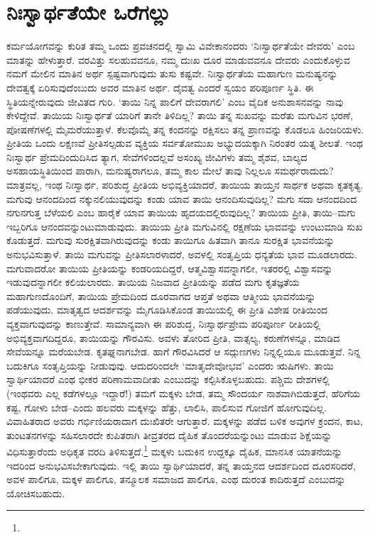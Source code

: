 \section*{ನಿಃಸ್ವಾರ್ಥತೆಯೇ ಒರೆಗಲ್ಲು}


ಕರ್ಮಯೋಗವನ್ನು ಕುರಿತ ತಮ್ಮ ಒಂದು ಪ್ರವಚನದಲ್ಲಿ ಸ್ವಾಮಿ ವಿವೇಕಾನಂದರು ‘ನಿಃಸ್ವಾರ್ಥ\-ತೆಯೇ ದೇವರು’ ಎಂಬ ಮಾತನ್ನು ಹೇಳುತ್ತಾರೆ. ವರವಿತ್ತು ಸಲಹುವವನೂ, ನಮ್ಮ ದುಃಖ ದೂರ ಮಾಡುವವನೂ ದೇವರು ಎಂದುಕೊಳ್ಳುವ ನಮಗೆ ಮೇಲಿನ ಮಾತಿನ ಅರ್ಥ ಸ್ಪಷ್ಟವಾಗುವುದು ತುಸು ಕಷ್ಟವೇ. ನಿಃಸ್ವಾರ್ಥತೆಯ ಮಹಾಗುಣ ಮನುಷ್ಯನನ್ನು ದೇವತ್ವಕ್ಕೆ ಏರಿಸುವುದೆಂಬುದು ಅವರ ಮಾತಿನ ಅರ್ಥ. ದೈವತ್ವ ಎಂದರೆ ಸ್ವಯಂ ಪರಿಪೂರ್ಣ ಸ್ಥಿತಿ. ಈ ಸ್ಥಿತಿಯನ್ನೇರುವುದು ಜೀವಿತದ ಗುರಿ. ‘ತಾಯಿ ನಿನ್ನ ಪಾಲಿಗೆ ದೇವರಾಗಲಿ’ ಎಂಬ ವೈದಿಕ ಅನುಶಾಸನವನ್ನು ನಾವು ಕೇಳಿದ್ದೇವೆ. ತಾಯಿಯ ನಿಃಸ್ವಾರ್ಥತೆ ಯಾರಿಗೆ ತಾನೇ ತಿಳಿದಿಲ್ಲ? ತಾಯಿ ತನ್ನ ಸುಖವನ್ನು ಮರೆತು ಮಗುವಿನ ಭರಣೆ, ಪೋಷಣೆಗಳಲ್ಲಿ ಮೈಮರೆಯುತ್ತಾಳೆ. ಕೆಲವೊಮ್ಮೆ ತನ್ನ ಕಂದನನ್ನು ರಕ್ಷಿಸಲು ತನ್ನ ಪ್ರಾಣವನ್ನು ಕೊಡಲೂ ಹಿಂಜರಿಯಳು. ಪ್ರೀತಿಯ ಒಂದು ಲಕ್ಷಣವೆ ಪ್ರೀತಿಸಲ್ಪಡುವ ವ್ಯಕ್ತಿಯ ಸರ್ವತೋಮುಖ ಅಭ್ಯುದಯಕ್ಕಾಗಿ ನಿರಂತರ ಯತ್ನ ಶೀಲತೆ. ಇಂಥ ನಿಃಸ್ವಾರ್ಥ ಪ್ರೇಮದಿಂದುದಿಸಿದ ತ್ಯಾಗ, ಸೇವೆಗಳಿಂದಲ್ಲವೆ ಅಸಂಖ್ಯ ಜೀವಿಗಳು ತಮ್ಮ ಶೈಶವ, ಬಾಲ್ಯದ ಅಸಹಾಯಸ್ಥಿತಿಯಿಂದ ಪಾರಾಗಿ, ಮನುಷ್ಯರಾಗಲೂ, ತಮ್ಮ ಕಾಲ ಮೇಲೆ ತಾವು ನಿಲ್ಲಲೂ ಸಮರ್ಥರಾದುದು? ಮಾತ್ರವಲ್ಲ, ಇಂಥ ನಿಃಸ್ವಾರ್ಥ, ಪರಿಶುದ್ಧ ಪ್ರೀತಿಯ ಅಭಿವ್ಯಕ್ತಿಯಾದರೆ, ತಾಯಿಯ ತಾಯ್ತನ ಸಾರ್ಥಕ ಅಥವಾ ಕೃತಕೃತ್ಯ. ಮಗುವು ಆನಂದದಿಂದ ನಕ್ಕುನಲಿಯುವುದನ್ನು ಕಂಡು ಯಾವ ತಾಯಿ ಆನಂದಿಸುವುದಿಲ್ಲ? ಮಗು ಸದಾ ಆನಂದದಿಂದ ನಗುನಗುತ್ತ ಬೆಳೆಯಲಿ ಎಂಬ ಹಾರೈಕೆ ಯಾವ ತಾಯಿಯ ಹೃದಯದಲ್ಲಿರುವುದಿಲ್ಲ? ತಾಯಿಯ ಪ್ರೀತಿ, ತಾಯಿ–ಮಗು ಇಬ್ಬರಿಗೂ ಆನಂದವನ್ನುಂಟುಮಾಡುವುದು. ತಾಯಿಯ ಪ್ರೀತಿ ಮಗುವಿನಲ್ಲಿ ರಕ್ಷಣೆಯ ಭಾವವನ್ನು ಉಂಟುಮಾಡಿ ಸುಖ ಕೊಡುತ್ತದೆ. ಮಗುವು ಸುರಕ್ಷಿತವಾಗಿರುವುದನ್ನು ಕಂಡು ತಾಯಿಗೂ ಹಿತವಾಗಿ ತಾನೂ ಸುರಕ್ಷಿತ ಭಾವನೆಯನ್ನು ಅನುಭವಿಸುತ್ತಾಳೆ. ತಾಯಿ ಮಗುವನ್ನು ಪ್ರೀತಿಸಲಾರಳಾದರೆ, ಅವಳಲ್ಲಿ ಸಂತೃಪ್ತಿಯ ಧನ್ಯತೆಯ ಭಾವ ಮೂಡಲಾರದು. ಮಗುವಾದರೋ ತಾಯಿಯ ಪ್ರೀತಿಯನ್ನು ಕಂಡರಿಯದಿದ್ದರೆ, ಆತ್ಮವಿಶ್ವಾಸವನ್ನಾಗಲೀ, ಇತರರಲ್ಲಿ ವಿಶ್ವಾಸವನ್ನು ಇಡುವುದನ್ನಾಗಲೀ ಕಲಿಯಲಾರದು. ತಾಯಿಯ ನಿಜವಾದ ಪ್ರೀತಿಯನ್ನು ಪಡೆದ ಮಗು ಕೃತಜ್ಞತೆಯ ಮಹಾಗುಣದೊಂದಿಗೆ, ತಾಯಿಯ ಪ್ರೇಮದಿಂದ ದೂರವಾಗದ ಆಪ್ತತೆ ಅಥವಾ ಆತ್ಮೀಯ ಭಾವನೆಯನ್ನು ಪಡೆಯುವುದು. ಮಾತೃತ್ವದ ಆದರ್ಶವನ್ನು ಮೈಗೂಡಿಸಿಕೊಂಡ ತಾಯಿಯಲ್ಲಿ ಈ ಪ್ರೀತಿ ವಿಶೇಷ ರೀತಿಯಿಂದ ವ್ಯಕ್ತವಾಗುವುದನ್ನು ಕಾಣುತ್ತೇವೆ. ಸಾಮಾನ್ಯವಾಗಿ ಈ ಪರಿಶುದ್ಧ, ನಿಃಸ್ವಾರ್ಥಪ್ರೇಮ ಪರಿಪೂರ್ಣ ರೀತಿಯಲ್ಲಿ ಅಭಿವ್ಯಕ್ತವಾಗದಿದ್ದರೂ, ತಾಯಿಯನ್ನು ಗೌರವಿಸು. ಅವಳು ತೋರಿದ ಪ್ರೀತಿ, ವಾತ್ಸಲ್ಯ, ಕರುಣೆಗಳನ್ನೂ, ಮಾಡಿದ ಸೇವೆಯನ್ನೂ ಮರೆಯಬೇಡ. ಕೃತಘ್ನನಾಗಬೇಡ. ಹಾಗೆ ಗೌರವಿಸಿದರೆ ಆ ಸದ್ಗುಣಗಳು ನಿನ್ನಲ್ಲಿಯೂ ಮೂಡುತ್ತವೆ. ನಿನ್ನ ಬದುಕಿಗೂ ಸಂತೃಪ್ತಿಯನ್ನು ನೀಡುವುವು. ಆದುದರಿಂದಲೇ ‘ಮಾತೃದೇವೋಭವ’ ಎಂದರು ಋಷಿಗಳು. ತಾಯಿ ಸ್ವಾರ್ಥಿಯಾದರೆ ಎಂಥ ಭೀಕರ ಪರಿಣಾಮವಾದೀತು ಎಂಬುದನ್ನು ಕಲ್ಪಿಸಿಕೊಳ್ಳಬಹುದು. ಪಶ್ಚಿಮ ದೇಶಗಳಲ್ಲಿ (ಇಂಥವರು ಎಲ್ಲ ಕಡೆಗಳಲ್ಲೂ ಇದ್ದಾರೆ!) ತಮಗೆ ಮಕ್ಕಳು ಬೇಡ, ತಮ್ಮ ಸೌಂದರ್ಯ ನಾಶವಾಗಿಬಿಡುತ್ತದೆ, ಹೆರಿಗೆಯ ಕಷ್ಟ, ಗೋಳು ಬೇಡ–ಎಂದು ಹಲವರು ಮಕ್ಕಳನ್ನು ಹೆತ್ತು, ಲಾಲಿಸಿ, ಪಾಲಿಸುವ ಗೋಜಿಗೆ ಹೋಗುವುದಿಲ್ಲ. ವಿವಾಹಿತರಾದ ಅವರು ಗರ್ಭಿಣಿಯರಾದಾಗ ದುಃಖಿತರೇ ಆಗುತ್ತಾರೆ. ಮಕ್ಕಳನ್ನು ಪಡೆದ ಬಳಿಕ ಅವುಗಳ ಕ್ರಂದನ, ಕಾಟ, ತುಂಟತನಗಳನ್ನು ಸಹಿಸಲಾರದೇ ಕುಪಿತರಾಗಿ ತೀವ್ರತರದ ದೈಹಿಕ ತೊಂದರೆಯನ್ನುಂಟು ಮಾಡುವ ಶಿಕ್ಷೆಯನ್ನು ವಿಧಿಸುತ್ತಾರೆಂದು ಅಧಿಕೃತ ವರದಿ ತಿಳಿಸುತ್ತದೆ.\footnote{} ಮಕ್ಕಳು ಬದುಕಿನ ಉದ್ದಕ್ಕೂ ದೈಹಿಕ, ಮಾನಸಿಕ ಯಾತನೆಯನ್ನು ಇದರಿಂದ ಅನುಭವಿಸಬೇಕಾಗುವುದು. ಇಲ್ಲಿ ತಾಯಿ ಸ್ವಾರ್ಥಿಯಾದರೆ, ತನ್ನ ತಾಯ್ತನದ ಆದರ್ಶದಿಂದ ದೂರಸರಿದರೆ, ಅವಳ ಪಾಲಿಗೂ, ಮಕ್ಕಳ ಪಾಲಿಗೂ, ತನ್ಮೂಲಕ ಸಮಾಜದ ಪಾಲಿಗೂ, ಎಂಥ ದುರಂತ ಕಾದಿರುತ್ತದೆ ಎಂಬುದನ್ನು ಯೋಚಿಸಬಹುದು.

